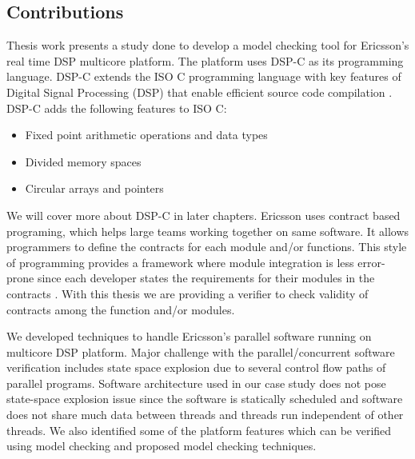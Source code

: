 \subsection{Contributions}
Thesis work presents a study done to develop a model checking tool for Ericsson's real time DSP multicore platform. The platform uses DSP-C as its programming language. DSP-C extends the ISO C programming language with key features of Digital Signal Processing (DSP) that enable efficient source code compilation \cite{website:dspc}. DSP-C adds the following features to ISO C:
\begin{itemize}
\item Fixed point arithmetic operations and data types 
\item Divided memory spaces
\item Circular arrays and pointers
\end{itemize}

We will cover more about DSP-C in later chapters. Ericsson uses contract based programing, which helps large teams working together on same software. It allows programmers to define the contracts for each module and/or functions. This style of programming provides a framework where module integration is less error-prone since each developer states the requirements for their modules in the contracts \cite{Meyer:1992:ADC:618974.619797}. With this thesis we are providing a verifier to check validity of contracts among the function and/or modules.

We developed techniques to handle Ericsson's parallel software running on multicore DSP platform. Major challenge with the parallel/concurrent software verification includes state space explosion due to several control flow paths of parallel programs. Software architecture used in our case study does not pose state-space explosion issue since the software is statically scheduled and software does not share much data between threads and threads run independent of other threads. We also identified some of the platform features which can be verified using model checking and proposed model checking techniques. 




